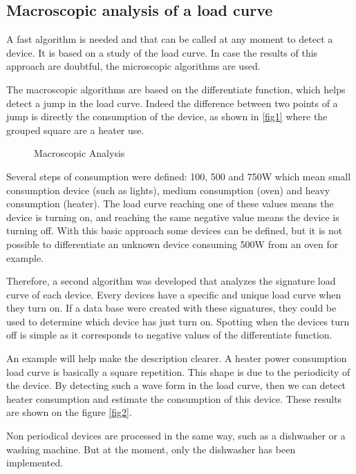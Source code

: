 \subsection{Macroscopic analysis of a load curve}
A fast algorithm is needed and that can be called at any moment to detect a device. It is based on a study of the load curve. In case the results of this approach are doubtful, the microscopic algorithms are used.

The macroscopic algorithms are based on the differentiate function, which helps detect a jump in the load curve. Indeed the difference between two points of a jump is directly the consumption of the device, as shown in \ref{fig1} where the grouped square are a heater use.


\begin{figure}[h]
 \begin{center}
   \caption{Macroscopic Analysis}
   \label{fig-1-1-2}
 \end{center}
\end{figure}

Several steps of consumption were defined: 100, 500 and 750W which mean small consumption device (such as lights), medium consumption (oven) and heavy consumption (heater). The load curve reaching one of these values means the device is turning on, and reaching the same negative value means the device is turning off. With this basic approach some devices can be defined, but it is not possible to differentiate an unknown device consuming 500W from an oven for example.

Therefore, a second algorithm was developed that analyzes the signature load curve of each device. Every devices have a specific and unique load curve when they turn on. If a data base were created with these signatures, they could be used to determine which device has just turn on. Spotting when the devices turn off is simple as it corresponds to negative values of the differentiate function.

An example will help make the description clearer. A heater power consumption load curve is basically a square repetition. This shape is due to the periodicity of the device. By detecting such a wave form in the load curve, then we can detect heater consumption and estimate the consumption of this device. These results are shown on the figure \ref{fig2}.


Non periodical devices are processed in the same way, such as a dishwasher or a washing machine. But at the moment, only the dishwasher has been implemented.


